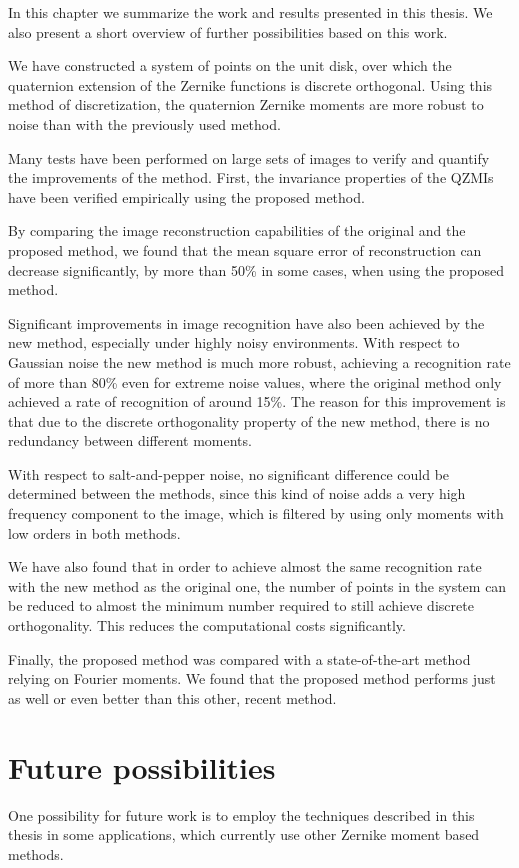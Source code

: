 In this chapter we summarize the work and results presented in this thesis. We also present a short overview of further possibilities based on this work.

We have constructed a system of points on the unit disk, over which the quaternion extension of the Zernike functions is discrete orthogonal. Using this method of discretization, the quaternion Zernike moments are more robust to noise than with the previously used method.

Many tests have been performed on large sets of images to verify and quantify the improvements of the method.
First, the invariance properties of the QZMIs have been verified empirically using the proposed method.

By comparing the image reconstruction capabilities of the original and the proposed method, we found that the mean square error of reconstruction can decrease significantly, by more than 50\% in some cases, when using the proposed method.

Significant improvements in image recognition have also been achieved by the new method, especially under highly noisy environments. With respect to Gaussian noise the new method is much more robust, achieving a recognition rate of more than 80\% even for extreme noise values, where the original method only achieved a rate of recognition of around 15\%. The reason for this improvement is that due to the discrete orthogonality property of the new method, there is no redundancy between different moments.

With respect to salt-and-pepper noise, no significant difference could be determined between the methods, since this kind of noise adds a very high frequency component to the image, which is filtered by using only moments with low orders in both methods.

We have also found that in order to achieve almost the same recognition rate with the new method as the original one, the number of points in the system can be reduced to almost the minimum number required to still achieve discrete orthogonality. This reduces the computational costs significantly.

Finally, the proposed method was compared with a state-of-the-art method relying on Fourier moments. We found that the proposed method performs just as well or even better than this other, recent method.

\section{Future possibilities}
One possibility for future work is to employ the techniques described in this thesis in some applications, which currently use other Zernike moment based methods.

